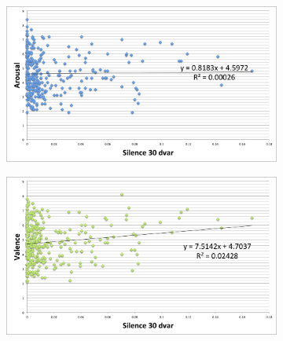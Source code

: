 \begin{figure}
	    \centering
        \begin{subfigure}[b]{0.48\textwidth}
                \includegraphics[width=\textwidth]{Figures/silence30dvar-arousal}
			   \vspace{20pt}
        \end{subfigure}
        \begin{subfigure}[b]{0.48\textwidth}
                \includegraphics[width=\textwidth]{Figures/silence30dvar-valence}
                  \vspace{20pt}
        \end{subfigure}        
        

\end{figure}
